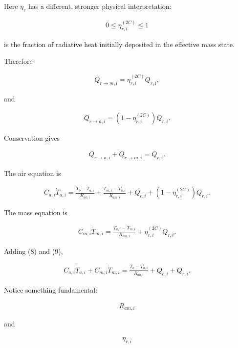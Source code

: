 \documentclass[11pt]{article}
\begin{document}
Here \(\eta_r\) has a different, stronger physical interpretation:

\begin{align}
\boxed{
0\le\eta_{r,i}^{(2C)}\le1
}
\end{align}

is the fraction of radiative heat initially deposited in the effective mass state.

Therefore

\begin{align}
Q_{r\rightarrow m,i}
=
\eta_{r,i}^{(2C)}Q_{r,i},
\tag{5}
\end{align}

and

\begin{align}
Q_{r\rightarrow a,i}
=
\left(1-\eta_{r,i}^{(2C)}\right)Q_{r,i}.
\tag{6}
\end{align}

Conservation gives

\begin{align}
Q_{r\rightarrow a,i}
+
Q_{r\rightarrow m,i}
=
Q_{r,i}.
\tag{7}
\end{align}

The air equation is

\begin{align}
\boxed{
C_{a,i}\dot T_{a,i}
=
\frac{T_o-T_{a,i}}{R_{ao,i}}
+
\frac{T_{m,i}-T_{a,i}}{R_{am,i}}
+
Q_{c,i}
+
(1-\eta_{r,i}^{(2C)})Q_{r,i}.
}
\tag{8}
\end{align}

The mass equation is

\begin{align}
\boxed{
C_{m,i}\dot T_{m,i}
=
\frac{T_{a,i}-T_{m,i}}{R_{am,i}}
+
\eta_{r,i}^{(2C)}Q_{r,i}.
}
\tag{9}
\end{align}

Adding (8) and (9),

\begin{align}
\boxed{
C_{a,i}\dot T_{a,i}
+
C_{m,i}\dot T_{m,i}
=
\frac{T_o-T_{a,i}}{R_{ao,i}}
+
Q_{c,i}
+
Q_{r,i}.
}
\tag{10}
\end{align}

Notice something fundamental:

\begin{align}
R_{am,i}
\end{align}

and

\begin{align}
\eta_{r,i}
\end{align}
\end{document}
